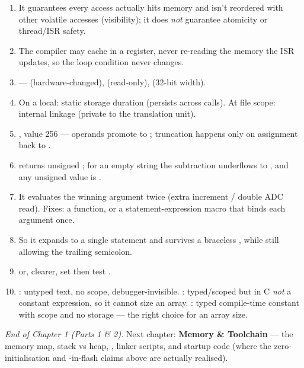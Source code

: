 \begin{answerkey}
\begin{enumerate}
\item It guarantees every access actually hits memory and isn't reordered
  with other volatile accesses (visibility); it does \emph{not} guarantee
  atomicity or thread/ISR safety.
\item The compiler may cache  in a register, never re-reading the
  memory the ISR updates, so the loop condition never changes.
\item {} ---
   (hardware-changed),  (read-only),
   (32-bit width).
\item On a local: static storage duration (persists across calls). At file
  scope: internal linkage (private to the translation unit).
\item {}, value 256 --- operands promote to ; truncation
  happens only on assignment back to .
\item {} returns unsigned ; for an empty string the
  subtraction underflows to , and any unsigned value is
  .
\item It evaluates the winning argument twice (extra increment / double ADC
  read). Fixes: a  function, or a statement-expression
  macro that binds each argument once.
\item So it expands to a single statement and survives a braceless , while still allowing the trailing semicolon.
\item {} or, clearer,
  set  then test .
\item {}: untyped text, no scope, debugger-invisible.
  : typed/scoped but in C \emph{not} a constant expression, so
  it cannot size an array. : typed compile-time constant with scope
  and no storage --- the right choice for an array size.
\end{enumerate}
\end{answerkey}

\begin{partnote}
\emph{End of Chapter 1 (Parts 1 \& 2).} Next chapter: \textbf{Memory \&
Toolchain} --- the memory map, stack vs heap, , linker
scripts, and startup code (where the  zero-initialisation and
-in-flash claims above are actually realised).
\end{partnote}
